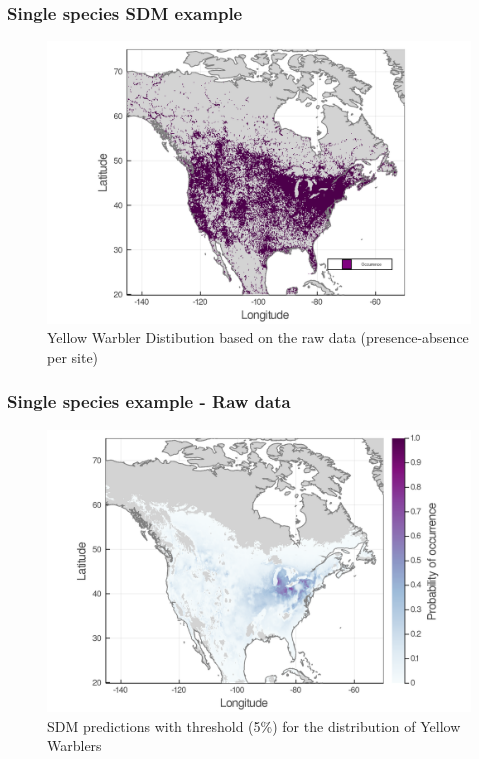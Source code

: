 \documentclass[10pt]{beamer}
\begin{document}
\begin{frame}
  \frametitle{Single species SDM example}
  \begin{figure}
    \centering
    \hspace*{-0cm}\includegraphics[scale=0.17]{fig/01_raw_singlesp.png}
    \caption{Yellow Warbler Distibution based on the raw data (presence-absence per site)}
  \end{figure}
\end{frame}

\begin{frame}
  \frametitle{Single species example - Raw data}
  \begin{figure}
    \centering
    \hspace*{-0cm}\includegraphics[scale=0.17]{fig/01_sdm_singlesp-threshold.png}
    \caption{SDM predictions with threshold (5\%) for the distribution of Yellow Warblers}
  \end{figure}
\end{frame}
\end{document}
